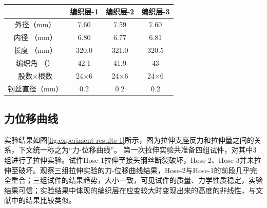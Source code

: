 \begin{table}[!htb]
	\centering
	\label{tab:hose-specimen}
	\begin{tabular*}{0.8\textwidth}{@{\extracolsep{\fill}}>{\hspace{0.5cm}}cccc}
		\toprule
		                  &     编织层-1     &     编织层-2     &     编织层-3     \\ \midrule
		外径（mm）            &     7.60      &     7.59      &     7.60      \\
		内径 （mm）           &     6.80      &     6.77      &     6.81      \\
		长度 （mm）           &     320.0     &     321.0     &     320.5     \\
		编织角 （\textdegree） &     42.1      &     41.9      &      43       \\
		股数$ \times $根数    & 24$ \times $6 & 24$ \times $6 & 24$ \times $6 \\
		钢丝直径（mm）          &      0.2      &      0.2      &      0.2      \\ \bottomrule
	\end{tabular*} 
\end{table}













\subsection{力位移曲线}
实验结果如图\ref{fig:experiment-results-1}所示，图为拉伸支座反力和拉伸量之间的关系，下文统一称之为“力-位移曲线”。
第一次拉伸实验共准备四组试件，对其中3组进行了拉伸实验。试件Hose-1拉伸至接头钢丝断裂破坏，Hose-2、Hose-3并未拉伸至破坏。观察三组拉伸实验的力-位移曲线结果，Hose-2与Hose-1的前段几乎完全重合；三组试件的结果趋势，大小一致，可见试件的质量、力学性质稳定，实验结果可信；实验结果中体现的编织层在应变较大时变现出来的高度的非线性，与\ha 文献中的结果比较类似。



